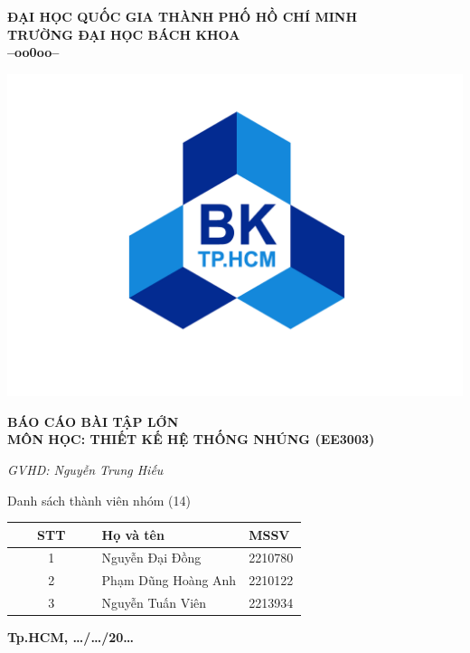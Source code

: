 \documentclass[12pt,a4paper]{report}
\begin{document}
		\BgThispage
	\thispagestyle{empty}
	\begin{center}
		\Large\textbf{ĐẠI HỌC QUỐC GIA THÀNH PHỐ HỒ CHÍ MINH \\ TRƯỜNG ĐẠI HỌC BÁCH KHOA\\--oo0oo--}
	\end{center}
	\vspace{0.5cm}
	\begin{center}
		\includegraphics[width=0.5\linewidth]{picture/bk.png}
	\end{center}
	\vspace{0.5cm}
	\begin{center}
		\LARGE\textbf{BÁO CÁO BÀI TẬP LỚN \\ MÔN HỌC: THIẾT KẾ HỆ THỐNG NHÚNG (EE3003)}
	\end{center}
	\vspace{1cm}
	
	\LARGE
	
	\hspace{7cm}\textit{{GVHD:} Nguyễn Trung Hiếu}
	
	\begin{center}
		Danh sách thành viên nhóm (14)
		
		\begin{tabular}{|c|p{0.5\linewidth}|p{0.2\linewidth}|}
			\hline
			STT & Họ và tên & MSSV\\
			\hline
			1 & Nguyễn Đại Đồng & 2210780\\
			\hline
			2 & Phạm Dũng Hoàng Anh & 2210122\\
			\hline
			3 & Nguyễn Tuấn Viên & 2213934\\
			\hline
		\end{tabular}
	\end{center}
	
	\vspace{3cm}
	\begin{center}
		\fontsize{8pt}{5pt}\selectfont\textbf{Tp.HCM, \dots/\dots/20\dots}
	\end{center}
	
	\newpage
	\thispagestyle{empty}
	\fontsize{13}{14}\selectfont
	\tableofcontents
	\listoftables
	\listoffigures
	
	
	
	
	
\end{document}
